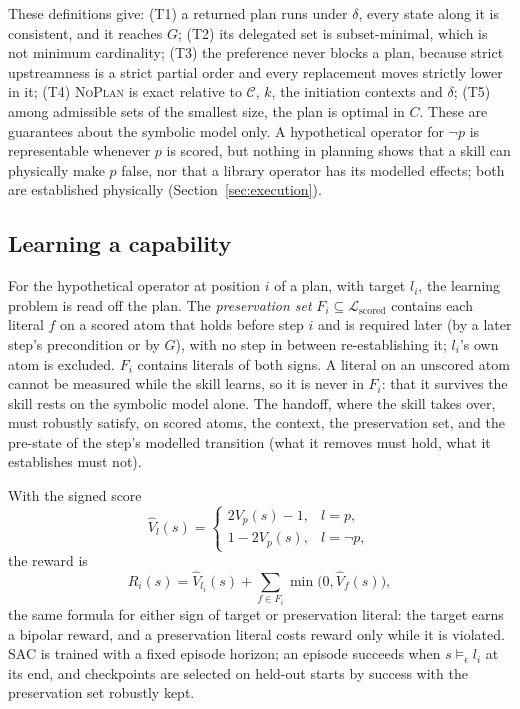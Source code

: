 These definitions give: (T1) a returned plan runs under $\delta$, every state along
it is consistent, and it reaches $G$;
(T2) its delegated set is subset-minimal, which is not minimum cardinality;
(T3) the preference never blocks a plan, because strict upstreamness is a strict partial
order and every replacement moves strictly lower in it; (T4) \textsc{NoPlan} is exact
relative to $\mathcal{C}$, $k$, the initiation contexts and $\delta$; (T5) among
admissible sets of the smallest size, the plan is optimal in $C$. These are guarantees
about the symbolic model only. A hypothetical operator for $\neg p$ is representable
whenever $p$ is scored, but nothing in planning shows that a skill can physically make
$p$ false, nor that a library operator has its modelled effects; both are established
physically (Section~\ref{sec:execution}).

\subsection{Learning a capability}
\label{sec:learning}

For the hypothetical operator at position $i$ of a plan, with target $l_i$, the learning
problem is read off the plan. The \emph{preservation set}
$F_i\subseteq\mathcal{L}_{\mathrm{scored}}$ contains each literal $f$ on a scored atom that
holds before step $i$ and is required later (by a later step's precondition or by $G$),
with no step in between re-establishing it; $l_i$'s own atom is excluded. $F_i$ contains
literals of both signs. A literal on an unscored atom cannot be measured while the skill
learns, so it is never in $F_i$: that it survives the skill rests on the symbolic model
alone. The handoff, where the skill takes over, must robustly satisfy, on scored atoms, the
context, the preservation set, and the pre-state of the step's modelled transition (what
it removes must hold, what it establishes must not).

With the signed score
\begin{equation}
  \widehat{V}_{l}(s)=
  \begin{cases} 2V_p(s)-1, & l=p,\\ 1-2V_p(s), & l=\neg p,\end{cases}
\end{equation}
the reward is
\begin{equation}
  R_i(s)=\widehat{V}_{l_i}(s)+\sum_{f\in F_i}\min\bigl(0,\widehat{V}_f(s)\bigr),
\end{equation}
the same formula for either sign of target or preservation literal: the target earns a
bipolar reward, and a preservation literal costs reward only while it is violated. SAC
is trained with a fixed episode horizon; an episode succeeds when $s\models_\epsilon l_i$
at its end, and checkpoints are selected on held-out starts by success with the
preservation set robustly kept.

